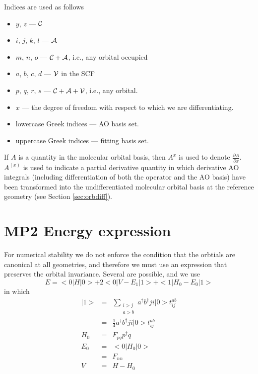 \documentclass[fleqn,12pt]{article}
\newcommand{\bra}{<\!}
\newcommand{\ket}{\!>}
\newcommand{\Core}{{\cal C}}
\newcommand{\Active}{{\cal A}}
\newcommand{\Virtual}{{\cal V}}
\newcommand{\tijab}{{t_{ij}^{ab}}}
\begin{document}
Indices are used as follows
\begin{itemize}
\item $y$, $z$ --- $\Core$
\item $i$, $j$, $k$, $l$ --- $\Active$
\item $m$, $n$, $o$ --- $\Core + \Active$, i.e., any orbital occupied
\item $a$, $b$, $c$, $d$ --- $\Virtual$
  in the SCF
\item $p$, $q$, $r$, $s$ --- $\Core + \Active + \Virtual$, i.e., any
  orbital.
\item $x$ --- the degree of freedom with respect to which we are
  differentiating.
\cbstart
\item lowercase Greek indices --- AO basis set.
\item uppercase Greek indices --- fitting basis set.
\cbend
\end{itemize}

If $A$ is a quantity in the molecular orbital basis, then $A^x$ is
used to denote $\frac{\partial A}{\partial x}$.  $A^{(x)}$ is used to
indicate a partial derivative quantity in which derivative AO
integrals (including differentiation of both the operator and the AO
basis) have been transformed into the undifferentiated molecular
orbital basis at the reference geometry (see Section
\ref{sec:orbdiff}).

\section{MP2 Energy expression}

For numerical stability we do not enforce the condition that the
orbtials are canonical at all geometries, and therefore we must use an
expression that preserves the orbital invariance.  Several are
possible, and we use
\begin{equation}
\label{eqn1}
  E = \bra 0 | H | 0 \ket + 2 \bra 0 | V-E_1 | 1 \ket +
      \bra 1 | H_0 - E_0 | 1 \ket
\end{equation}
in which 
\begin{eqnarray}
  | 1 \ket & = & \sum_{
\begin{array}{cc}
i > j \\
  a > b
\end{array}}
a^{\dagger}b^{\dagger}ji | 0
  \ket \tijab  \nonumber \\
           & = & \frac{1}{4} a^{\dagger}b^{\dagger}ji | 0 \ket \tijab \\
  H_0 & = & F_{pq} p^{\dagger}q \\
  E_0 & = & \bra 0 | H_0 | 0 \ket \nonumber \\
      & = & F_{nn} \\
   V  & = & H - H_0
\end{eqnarray}
\end{document}
